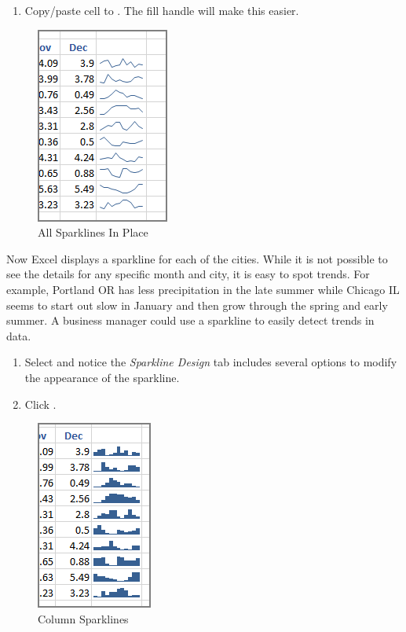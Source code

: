 \begin{enumerate}[resume]
	\item Copy/paste cell  to . The fill handle will make this easier. 
\end{enumerate}

\begin{figure}[H]
	\centering
	\includegraphics[width=\maxwidth{.50\linewidth}]{gfx/ch08_fig04}
	\caption{All Sparklines In Place}
	\label{08:fig04}
\end{figure}

Now Excel displays a sparkline for each of the cities. While it is not possible to see the details for any specific month and city, it is easy to spot trends. For example, Portland OR has less precipitation in the late summer while Chicago IL seems to start out slow in January and then grow through the spring and early summer. A business manager could use a sparkline to easily detect trends in data.

\begin{enumerate}[resume]
	\item Select  and notice the \textit{Sparkline Design} tab includes several options to modify the appearance of the sparkline. 
	\item Click .
\end{enumerate}

\begin{figure}[H]
	\centering
	\includegraphics[width=\maxwidth{.50\linewidth}]{gfx/ch08_fig05}
	\caption{Column Sparklines}
	\label{08:fig05}
\end{figure}

